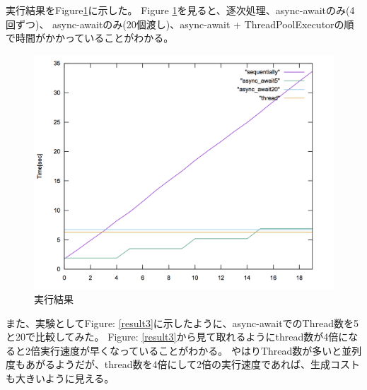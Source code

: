 \documentclass[14pt, oneside]{article}     	%
\begin{document}


実行結果をFigure\ref{result}に示した。
Figure \ref{result}を見ると、逐次処理、async-awaitのみ(4回ずつ)、
async-awaitのみ(20個渡し)、async-await + ThreadPoolExecutorの順で時間がかかっていることがわかる。

% 
%
% 
%
% 
%
% 

\begin{figure}[H]
  \centering
  \includegraphics[width=13cm]{time2.png}
  \caption{実行結果}
  \label{result}
\end{figure}

また、実験としてFigure: \ref{result3}に示したように、async-awaitでのThread数を5と20で比較してみた。
Figure: \ref{result3}から見て取れるようにthread数が4倍になると2倍実行速度が早くなっていることがわかる。
やはりThread数が多いと並列度もあがるようだが、thread数を4倍にして2倍の実行速度であれば、生成コストも大きいように見える。
\end{document}
